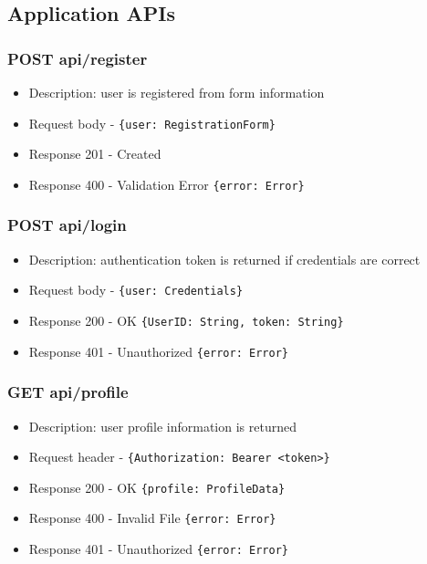 \subsection{Application APIs}

\subsubsection{POST api/register}
\begin{itemize}
    \item Description: user is registered from form information
    \item Request body - \verb|{user: RegistrationForm}|
    \item Response 201 - Created
    \item Response 400 - Validation Error \verb|{error: Error}|
\end{itemize}

\subsubsection{POST api/login}
\begin{itemize}
    \item Description: authentication token is returned if credentials are correct
    \item Request body - \verb|{user: Credentials}|
    \item Response 200 - OK \verb|{UserID: String, token: String}|
    \item Response 401 - Unauthorized \verb|{error: Error}|
\end{itemize}

\subsubsection{GET api/profile}
\begin{itemize}
    \item Description: user profile information is returned
    \item Request header - \verb|{Authorization: Bearer <token>}|
    \item Response 200 - OK \verb|{profile: ProfileData}|
    \item Response 400 - Invalid File \verb|{error: Error}|
    \item Response 401 - Unauthorized \verb|{error: Error}|
\end{itemize}

